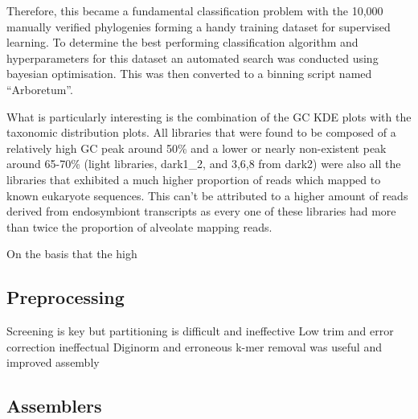 Therefore, this became a fundamental classification problem with the 10,000 manually verified phylogenies
forming a handy training dataset for supervised learning.   To determine the best performing
classification algorithm and hyperparameters for this dataset an automated search was conducted 
using bayesian optimisation.  This was then converted to a binning script named ``Arboretum''.



%
%



What is particularly interesting is the combination of the GC KDE plots 
with the taxonomic distribution plots.
All libraries that were found to be composed of a relatively high GC peak around 50\% 
and a lower or nearly non-existent peak around 65-70\% (light libraries, dark1\_2,
and 3,6,8 from dark2) were also all the libraries that exhibited a much higher
proportion of reads which mapped to known eukaryote sequences.
This can't be attributed to a higher amount of reads derived from endosymbiont
transcripts as every one of these libraries had more than twice the proportion of
alveolate mapping reads.



On the basis that the high 




\subsection{Preprocessing}

Screening is key but partitioning is difficult and ineffective
Low trim and error correction ineffectual
Diginorm and erroneous k-mer removal was useful and improved assembly


\subsection{Assemblers}



